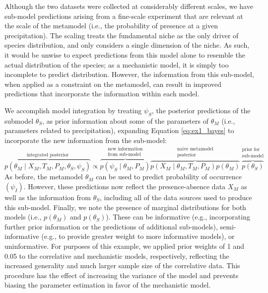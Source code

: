 \documentclass[11pt]{article}
\begin{document}
Although the two datasets were collected at considerably different scales, we have sub-model predictions arising from a fine-scale experiment that are relevant at the scale of the metamodel (i.e., the probability of presence at a given precipitation). 
The scaling treats the fundamental niche as the only driver of species distribution, and only considers a single dimension of the niche.
As such, it would be unwise to expect predictions from this model alone to resemble the actual distribution of the species; as a mechanistic model, it is simply too incomplete to predict distribution.
However, the information from this sub-model, when applied as a constraint on the metamodel, can result in improved predictions that incorporate the information within each model.

We accomplish model integration by treating \(\psi_S\), the posterior predictions of the submodel \(\theta_S\), as prior information about some of the parameters of \(\theta_M\) (i.e., parameters related to precipitation), expanding Equation \ref{eq:ex1_bayes} to incorporate the new information from the sub-model:
\begin{equation}
	\label{eq:ex1_integrated}
	\overbrace{p(\theta_M \mid X_M, T_M, P_M, \theta_S, \psi_S)}^\text{integrated posterior}
	\propto
	\overbrace{p\left (\psi_S \mid \theta_M,P_M \right )}^{\substack{\text{new information} \\ \text{from sub-model}}}
	\overbrace{p \left(X_M \mid \theta_M, T_M, P_M \right) p \left(\theta_M \right)}^{\substack{\text{naive metamodel} \\ \text{posterior}}}
	\overbrace{p \left(\theta_S \right)}^{\substack{\text{prior for} \\ \text{sub-model}}}	
\end{equation}
As before, the metamodel \(\theta_M\) can be used to predict probability of occurrence \((\psi_I)\).
However, these predictions now reflect the presence-absence data \(X_M\) as well as the information from \(\theta_S\), including all of the data sources used to produce this sub-model.
Finally, we note the presence of marginal distributions for both models (i.e., \(p(\theta_M)\) and \(p(\theta_S)\)).
These can be informative (e.g., incorporating further prior information or the predictions of additional sub-models), semi-informative (e.g., to provide greater weight to more informative models), or uninformative.
For purposes of this example, we applied prior weights of 1 and 0.05 to the correlative and mechanistic models, respectively, reflecting the increased generality and much larger sample size of the correlative data.
This procedure has the effect of increasing the variance of the model and prevents biasing the parameter estimation in favor of the mechanistic model.
\end{document}
